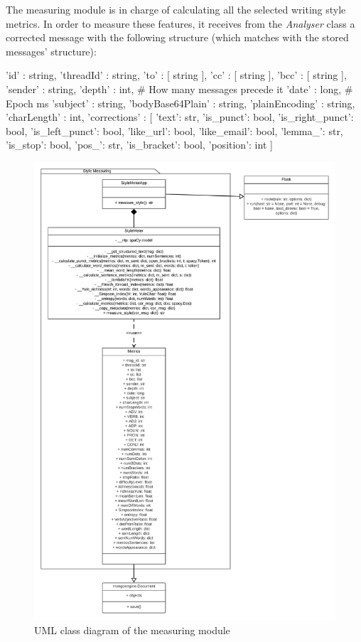The measuring module is in charge of calculating all the selected writing style metrics. In order to measure these features, it receives from the \textit{Analyser} class a corrected message with the following structure (which matches with the stored messages' structure):

\begin{python}
	{
		'id' : string,
		'threadId' : string,
		'to' : [ string ],
		'cc' : [ string ],
		'bcc' : [ string ],
		'sender' : string,
		'depth' : int,               # How many messages precede it
		'date' : long,               # Epoch ms
		'subject' : string,
		'bodyBase64Plain' : string,
		'plainEncoding' : string,
		'charLength' : int,
		'corrections' : [
		{
			'text': str,
			'is_punct': bool,
			'is_right_punct': bool,
			'is_left_punct': bool,
			'like_url': bool,
			'like_email': bool,
			'lemma_': str,
			'is_stop': bool,
			'pos_': str,
			'is_bracket': bool,
			'position': int
		}
		]
	}
\end{python}

\begin{figure}[p]
	\centering%
	\centerline{\includegraphics[height=0.85\paperheight]{Imagenes/Bitmap/Analyser/metUML.png}}%
	\caption{UML class diagram of the measuring module}%
	\label{fig:umlmet}
\end{figure}


